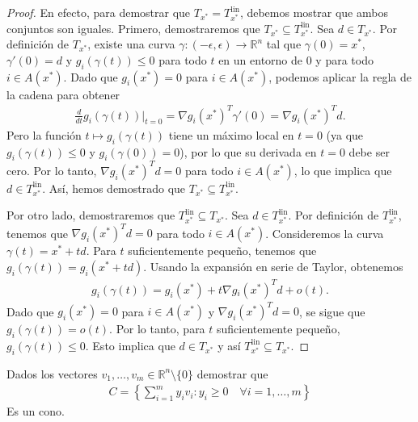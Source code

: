 \documentclass{article}
\newcommand{\R}{\mathbb{R}}
\newenvironment{theorem}[2][Ejercicio]{\begin{trivlist}
\item[\hskip \labelsep {\bfseries #1}\hskip \labelsep {\bfseries #2.}]}{\end{trivlist}}
\begin{document}
\begin{proof}
    En efecto, para demostrar que \( T_{x^*} = T^{\text{lin}}_{x^*} \), debemos mostrar que ambos conjuntos son iguales.
    Primero, demostraremos que \( T_{x^*} \subseteq T^{\text{lin}}_{x^*} \). Sea \( d \in T_{x^*} \). Por definición de \( T_{x^*} \), existe una curva
    \( \gamma : (-\epsilon, \epsilon) \to \R^n \) tal que \( \gamma(0) = x^* \), \( \gamma'(0) = d \) y \( g_i(\gamma(t)) \leq 0 \) para todo \( t \) en un entorno de \( 0 \) y para todo \( i \in A(x^*) \).
    Dado que \( g_i(x^*) = 0 \) para \( i \in A(x^*) \), podemos aplicar la regla de la cadena para obtener \begin{align*}
        \frac{d}{dt} g_i(\gamma(t)) \bigg|_{t=0} = \nabla g_i(x^*)^T \gamma'(0) = \nabla {g_i(x^*)}^T d.
    \end{align*}
    Pero la función \( t \mapsto g_i(\gamma(t)) \) tiene un máximo local en \( t = 0 \) (ya que \( g_i(\gamma(t)) \leq 0 \) y \( g_i(\gamma(0)) = 0 \)), por lo que su derivada en \( t = 0 \) debe ser cero.
    Por lo tanto, \( \nabla {g_i(x^*)}^T d = 0 \) para todo \( i \in A(x^*) \), lo que implica que \( d \in T^{\text{lin}}_{x^*} \).
    Así, hemos demostrado que \( T_{x^*} \subseteq T^{\text{lin}}_{x^*} \).

    Por otro lado, demostraremos que \( T^{\text{lin}}_{x^*} \subseteq T_{x^*} \). Sea \( d \in T^{\text{lin}}_{x^*} \). Por definición de \( T^{\text{lin}}_{x^*} \), tenemos que \( \nabla {g_i(x^*)}^T d = 0 \) para todo \( i \in A(x^*) \).
    Consideremos la curva \( \gamma(t) = x^* + td \). Para \( t \) suficientemente pequeño, tenemos que \( g_i(\gamma(t)) = g_i(x^* + td) \). Usando la expansión en serie de Taylor, obtenemos \begin{align*}
        g_i(\gamma(t)) = g_i(x^*) + t \nabla g{_i(x^*)}^T d + o(t).
    \end{align*}
    Dado que \( g_i(x^*) = 0 \) para \( i \in A(x^*) \) y \( \nabla {g_i(x^*)}^T d = 0 \), se sigue que \( g_i(\gamma(t)) = o(t) \). Por lo tanto, para \( t \) suficientemente pequeño, \( g_i(\gamma(t)) \leq 0 \).
    Esto implica que \( d \in T_{x^*} \) y así \( T^{\text{lin}}_{x^*} \subseteq T_{x^*} \).
\end{proof}

\begin{theorem}{4}
    Dados los vectores \( v_1, \ldots, v_m \in \R^n \setminus \{ 0 \} \) demostrar que \begin{align*}
        C = \left \{ \sum_{i = 1}^m y_i v_i : y_i \geq 0 \quad \forall i = 1, \ldots, m \right \}
    \end{align*}
    Es un cono.
\end{theorem}
\end{document}
